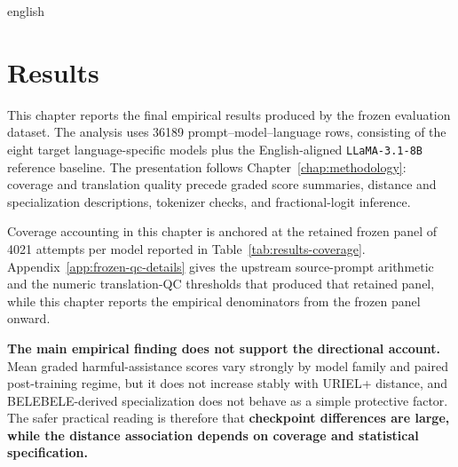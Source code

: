 
\begin{otherlanguage*}{english}



\chapter{Results}
\label{chap:results}

This chapter reports the final empirical results produced by the frozen evaluation dataset. The analysis uses 36189 prompt--model--language rows, consisting of the eight target language-specific models plus the English-aligned \texttt{LLaMA-3.1-8B} reference baseline. The presentation follows Chapter~\ref{chap:methodology}: coverage and translation quality precede graded score summaries, distance and specialization descriptions, tokenizer checks, and fractional-logit inference.

Coverage accounting in this chapter is anchored at the retained frozen panel of 4021 attempts per model reported in Table~\ref{tab:results-coverage}. Appendix~\ref{app:frozen-qc-details} gives the upstream source-prompt arithmetic and the numeric translation-QC thresholds that produced that retained panel, while this chapter reports the empirical denominators from the frozen panel onward.

\textbf{The main empirical finding does not support the directional account.} Mean graded harmful-assistance scores vary strongly by model family and paired post-training regime, but it does not increase stably with URIEL+ distance, and BELEBELE-derived specialization does not behave as a simple protective factor. The safer practical reading is therefore that \textbf{checkpoint differences are large, while the distance association depends on coverage and statistical specification.}


\end{otherlanguage*}
